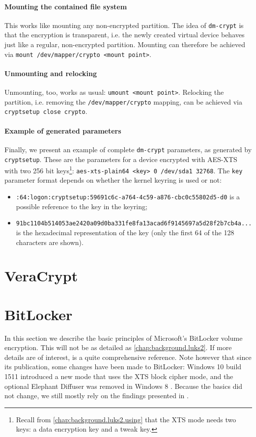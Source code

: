 \paragraph{Mounting the contained file system}
This works like mounting any non-encrypted partition. The idea of \texttt{dm-crypt} is that the encryption is transparent, i.e. the newly created virtual device behaves just like a regular, non-encrypted partition. Mounting can therefore be achieved via \texttt{mount /dev/mapper/crypto <mount point>}.

\paragraph{Unmounting and relocking}
Unmounting, too, works as usual: \texttt{umount <mount point>}. Relocking the partition, i.e. removing the \texttt{/dev/mapper/crypto} mapping, can be achieved via \texttt{cryptsetup close crypto}.

\paragraph{Example of generated parameters} Finally, we present an example of complete \texttt{dm-crypt} parameters, as generated by \texttt{cryptsetup}. These are the parameters for a device encrypted with AES-XTS with two 256 bit keys\footnote{\label{fn:otherapproaches.linux.aesxtskeys} Recall from \autoref{chap:background.luks2.using} that the XTS mode needs two keys: a data encryption key and a tweak key.}: \texttt{aes-xts-plain64 <key> 0 /dev/sda1 32768}. The \texttt{key} parameter format depends on whether the kernel keyring is used or not:
\begin{itemize}
	\item \texttt{:64:logon:cryptsetup:59691c6c-a764-4c59-a876-cbc0c55802d5-d0} is a possible reference to the key in the keyring;
	\item \texttt{91bc1104b514053ae2420a09d0ba331fe8fa13acad6f9145697a5d28f2b7cb4a...} is the hexadecimal representation of the key (only the first 64 of the 128 characters are shown).
\end{itemize}

\section{VeraCrypt}
\label{chap:otherapproaches.veracrypt}

\section{BitLocker}
\label{chap:otherapproaches.bitlocker}
In this section we describe the basic principles of Microsoft's BitLocker volume encryption. This will not be as detailed as \autoref{chap:background.luks2}. If more details are of interest, \cite{Kornblum2009} is a quite comprehensive reference. Note however that since its publication, some changes have been made to BitLocker: Windows 10 build 1511 introduced a new mode that uses the XTS block cipher mode, and the optional Elephant Diffuser was removed in Windows 8 \cite{Sosnowski2016}. Because the basics did not change, we still mostly rely on the findings presented in \cite{Kornblum2009}.

